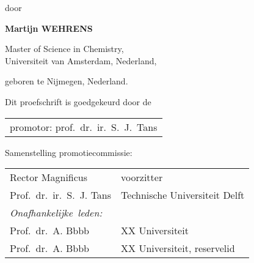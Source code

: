 \begin{titlepage}
\begin{center}
\bigskip
\bigskip

door

\bigskip
\bigskip

\makeatletter
{\Large\titlefont\bfseries Martijn WEHRENS}
\makeatother

\bigskip
\bigskip

Master of Science in Chemistry, \\
Universiteit van Amsterdam, Nederland,

geboren te Nijmegen, Nederland.

\vspace*{2\bigskipamount}

\end{center}

\clearpage
\thispagestyle{empty}

\noindent Dit proefschrift is goedgekeurd door de

\medskip\noindent
\begin{tabular}{l}
    promotor: prof.\ dr.\ ir.\ S.\ J.\ Tans 
\end{tabular}

\bigskip
\noindent Samenstelling promotiecommissie:

\medskip\noindent
\begin{tabular}{p{4cm}l}
    Rector Magnificus & voorzitter \\
    Prof.\ dr.\ ir.\ S.\ J. Tans & Technische Universiteit Delft \\

    \medskip
    \mbox{\emph{Onafhankelijke leden:}} & \\

    Prof.\ dr.\ A. Bbbb & XX Universiteit \\
    Prof.\ dr.\ A. Bbbb & XX Universiteit, reservelid \\
      
\end{tabular}



\vfill


\end{titlepage}
